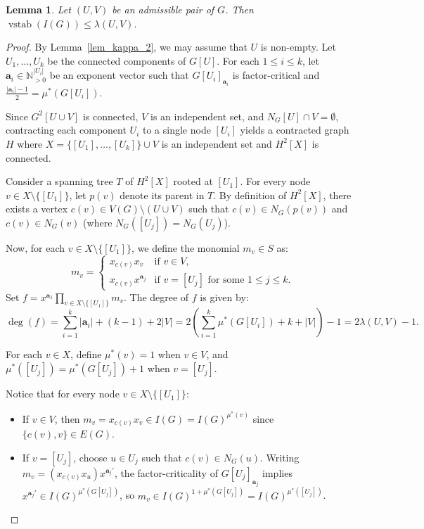 \documentclass[10pt,a4paper]{amsart}
\newtheorem{lem}{Lemma}
\begin{document}
\begin{lem}\label{lem_admissible} 
Let $(U,V)$ be an admissible pair of $G$. Then $\operatorname{vstab}(I(G)) \le \lambda(U,V)$. 
\end{lem}

\begin{proof} 
By Lemma~\ref{lem_kappa_2}, we may assume that $U$ is non-empty. Let $U_1, \ldots, U_k$ be the connected components of $G[U]$. For each $1 \le i \le k$, let $\mathbf{a}_i \in \mathbb{N}_{>0}^{|U_i|}$ be an exponent vector such that $G[U_i]_{\mathbf{a}_i}$ is factor-critical and $\frac{|\mathbf{a}_i| - 1}{2} = \mu^*(G[U_i])$. 

Since $G^2[U \cup V]$ is connected, $V$ is an independent set, and $N_G[U] \cap V = \emptyset$, contracting each component $U_i$ to a single node $[U_i]$ yields a contracted graph $H$ where $X = \{[U_1], \ldots, [U_k]\} \cup V$ is an independent set and $H^2[X]$ is connected.

Consider a spanning tree $T$ of $H^2[X]$ rooted at $[U_1]$. For every node $v \in X \setminus \{[U_1]\}$, let $p(v)$ denote its parent in $T$. By definition of $H^2[X]$, there exists a vertex $c(v) \in V(G) \setminus (U \cup V)$ such that $c(v) \in N_G(p(v))$ and $c(v) \in N_G(v)$ (where $N_G([U_j]) = N_G(U_j)$).

Now, for each $v \in X \setminus \{[U_1]\}$, we define the monomial $m_v \in S$ as:
\[
m_v = 
\begin{cases}
x_{c(v)} x_v & \text{if } v \in V, \\
x_{c(v)} x^{\mathbf{a}_j} & \text{if } v = [U_j] \text{ for some } 1 \le j \le k.
\end{cases}
\]
Set $f = x^{\mathbf{a}_1} \prod_{v \in X \setminus \{[U_1]\}} m_v$. The degree of $f$ is given by:
\[
\deg(f) = \sum_{i=1}^k |\mathbf{a}_i| + (k - 1) + 2|V| = 2 \left( \sum_{i=1}^k \mu^*(G[U_i]) + k + |V| \right) - 1 = 2\lambda(U,V) - 1.
\]

For each $v \in X$, define $\mu^*(v) = 1$ when $v \in V$, and $\mu^*([U_j]) = \mu^*(G[U_j]) + 1$ when $v = [U_j]$. 

Notice that for every node $v \in X \setminus \{[U_1]\}$:
\begin{itemize}
    \item If $v \in V$, then $m_v = x_{c(v)} x_v \in I(G) = I(G)^{\mu^*(v)}$ since $\{c(v), v\} \in E(G)$.
    \item If $v = [U_j]$, choose $u \in U_j$ such that $c(v) \in N_G(u)$. Writing $m_v = (x_{c(v)} x_u) x^{\mathbf{a}_j'}$, the factor-criticality of $G[U_j]_{\mathbf{a}_j}$ implies $x^{\mathbf{a}_j'} \in I(G)^{\mu^*(G[U_j])}$, so $m_v \in I(G)^{1 + \mu^*(G[U_j])} = I(G)^{\mu^*([U_j])}$.
\end{itemize}


\end{proof}
\end{document}
